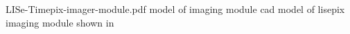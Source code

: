 \documentclass[../main.tex]{subfiles}%
\begin{document}
%
    \Xsupplement%
    \begin{supplement}%
        \supplementcaption%
            {LISe-Timepix-imager-module.pdf}%
            { model of  imaging module}%
            {\Gls{cad} model of \gls{lisepix} imaging module shown in }%
        \label{sup:lise-timepix-imager-module}%
    \end{supplement}%
\end{document}
